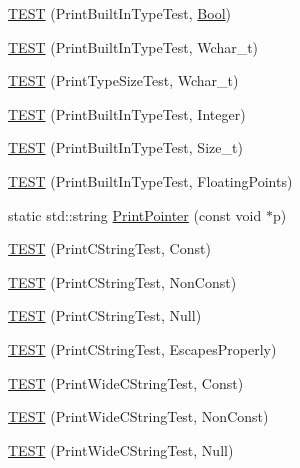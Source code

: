 \begin{DoxyCompactItemize}
\item 
\mbox{\hyperlink{namespacetesting_1_1gtest__printers__test_a6f08c464dc0b8eb822368f552d4467ad}{T\+E\+ST}} (Print\+Built\+In\+Type\+Test, \mbox{\hyperlink{structBool}{Bool}})
\item 
\mbox{\hyperlink{namespacetesting_1_1gtest__printers__test_ab567ebd97eff0a4b9a20a5f5cb77d678}{T\+E\+ST}} (Print\+Built\+In\+Type\+Test, Wchar\+\_\+t)
\item 
\mbox{\hyperlink{namespacetesting_1_1gtest__printers__test_a705ec4c2886606a22194107397fceea6}{T\+E\+ST}} (Print\+Type\+Size\+Test, Wchar\+\_\+t)
\item 
\mbox{\hyperlink{namespacetesting_1_1gtest__printers__test_a278d53e99390c7b31ff531524fe5e86e}{T\+E\+ST}} (Print\+Built\+In\+Type\+Test, Integer)
\item 
\mbox{\hyperlink{namespacetesting_1_1gtest__printers__test_a991dc124d153742c3ca126b2fa9ccab5}{T\+E\+ST}} (Print\+Built\+In\+Type\+Test, Size\+\_\+t)
\item 
\mbox{\hyperlink{namespacetesting_1_1gtest__printers__test_acde0b28d177604ddb5e185d7b107f6f7}{T\+E\+ST}} (Print\+Built\+In\+Type\+Test, Floating\+Points)
\item 
static std\+::string \mbox{\hyperlink{namespacetesting_1_1gtest__printers__test_ac1a9747bc3353294dd18c295a03915e2}{Print\+Pointer}} (const void $\ast$p)
\item 
\mbox{\hyperlink{namespacetesting_1_1gtest__printers__test_a6cd47b21ad8d9ac66ba57b5b6415a924}{T\+E\+ST}} (Print\+C\+String\+Test, Const)
\item 
\mbox{\hyperlink{namespacetesting_1_1gtest__printers__test_a89d9905fecee1b976c26d35498734dd4}{T\+E\+ST}} (Print\+C\+String\+Test, Non\+Const)
\item 
\mbox{\hyperlink{namespacetesting_1_1gtest__printers__test_ad29b97d58a4d1e5e8dd4d854f66b9e22}{T\+E\+ST}} (Print\+C\+String\+Test, Null)
\item 
\mbox{\hyperlink{namespacetesting_1_1gtest__printers__test_a140030b990011abab91d4c0b59f21edd}{T\+E\+ST}} (Print\+C\+String\+Test, Escapes\+Properly)
\item 
\mbox{\hyperlink{namespacetesting_1_1gtest__printers__test_a4caa1f81979cdc6f5ada95e01a4fae63}{T\+E\+ST}} (Print\+Wide\+C\+String\+Test, Const)
\item 
\mbox{\hyperlink{namespacetesting_1_1gtest__printers__test_a8812b5f088e13083ebb8a7e35fbcdae7}{T\+E\+ST}} (Print\+Wide\+C\+String\+Test, Non\+Const)
\item 
\mbox{\hyperlink{namespacetesting_1_1gtest__printers__test_acd1267d49d61ad53b2b8a88f68fca3a7}{T\+E\+ST}} (Print\+Wide\+C\+String\+Test, Null)

\end{DoxyCompactItemize}
